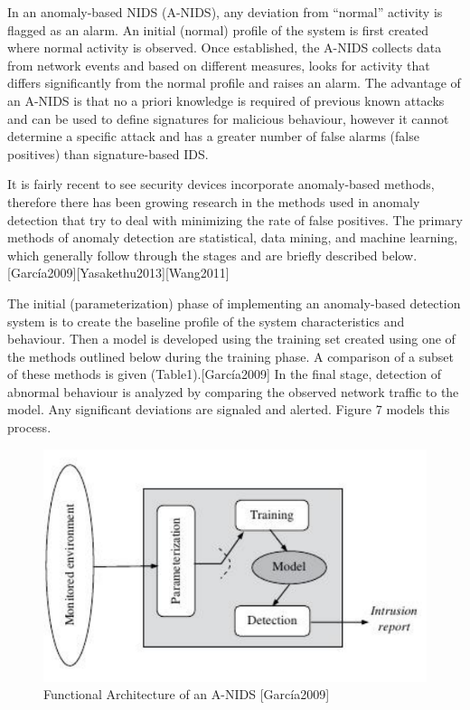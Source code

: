 \documentclass[12pt,]{article}
\begin{document}
In an anomaly-based NIDS (A-NIDS), any deviation from ``normal''
activity is flagged as an alarm. An initial (normal) profile of the
system is first created where normal activity is observed. Once
established, the A-NIDS collects data from network events and based on
different measures, looks for activity that differs significantly from
the normal profile and raises an alarm. The advantage of an A-NIDS is
that no a priori knowledge is required of previous known attacks and can
be used to define signatures for malicious behaviour, however it cannot
determine a specific attack and has a greater number of false alarms
(false positives) than signature-based IDS.

It is fairly recent to see security devices incorporate anomaly-based
methods, therefore there has been growing research in the methods used
in anomaly detection that try to deal with minimizing the rate of false
positives. The primary methods of anomaly detection are statistical,
data mining, and machine learning, which generally follow through the
stages and are briefly described
below.{[}García2009{]}{[}Yasakethu2013{]}{[}Wang2011{]}

The initial (parameterization) phase of implementing an anomaly-based
detection system is to create the baseline profile of the system
characteristics and behaviour. Then a model is developed using the
training set created using one of the methods outlined below during the
training phase. A comparison of a subset of these methods is given
(Table1).{[}García2009{]} In the final stage, detection of abnormal
behaviour is analyzed by comparing the observed network traffic to the
model. Any significant deviations are signaled and alerted. Figure 7
models this process.

\begin{figure}

{\centering \includegraphics{thesis_files/figure-latex/unnamed-chunk-11-1} 

}

\caption{Functional Architecture of an A-NIDS [García2009]}\label{fig:unnamed-chunk-11}
\end{figure}
\end{document}
